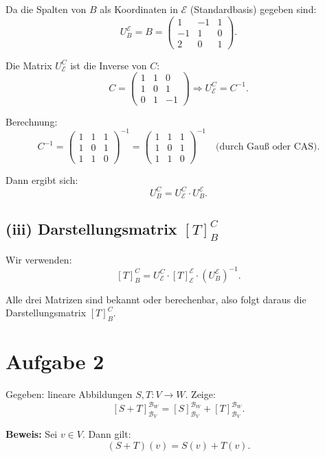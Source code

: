 \documentclass{article}
\begin{document}
Da die Spalten von \( B \) als Koordinaten in \( \mathcal{E} \) (Standardbasis) gegeben sind:
\[
U_B^{\mathcal{E}} = B = \begin{pmatrix}1 & -1 & 1 \\ -1 & 1 & 0 \\ 2 & 0 & 1\end{pmatrix}.
\]

Die Matrix \( U_{\mathcal{E}}^C \) ist die Inverse von \( C \):
\[
C = \begin{pmatrix}1 & 1 & 0 \\ 1 & 0 & 1 \\ 0 & 1 & -1\end{pmatrix}
\Rightarrow U_{\mathcal{E}}^C = C^{-1}.
\]

Berechnung:
\[
C^{-1} = \begin{pmatrix}
1 & 1 & 1 \\
1 & 0 & 1 \\
1 & 1 & 0
\end{pmatrix}^{-1} = \begin{pmatrix}
1 & 1 & 1 \\
1 & 0 & 1 \\
1 & 1 & 0
\end{pmatrix}^{-1} \quad \text{(durch Gauß oder CAS)}.
\]

Dann ergibt sich:
\[
U_B^C = U_{\mathcal{E}}^C \cdot U_B^{\mathcal{E}}.
\]

\subsection*{(iii) Darstellungsmatrix \( [T]_B^C \)}

Wir verwenden:
\[
[T]_B^C = U_{\mathcal{E}}^C \cdot [T]_{\mathcal{E}}^{\mathcal{E}} \cdot (U_B^{\mathcal{E}})^{-1}.
\]

Alle drei Matrizen sind bekannt oder berechenbar, also folgt daraus die Darstellungsmatrix \( [T]_B^C \).

\newpage

\section*{Aufgabe 2}

Gegeben: lineare Abbildungen \( S, T : V \to W \). Zeige:
\[
[S + T]_{\mathcal{B}_V}^{\mathcal{B}_W} = [S]_{\mathcal{B}_V}^{\mathcal{B}_W} + [T]_{\mathcal{B}_V}^{\mathcal{B}_W}.
\]

\textbf{Beweis:} Sei \( v \in V \). Dann gilt:
\[
(S + T)(v) = S(v) + T(v).
\]
\end{document}
